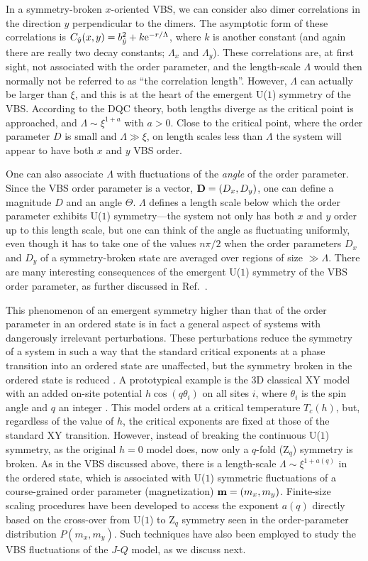 \documentclass[10pt,pre,aps,twocolumn,showpacs,subscriptaddresses,floatfix]{revtex4}
\begin{document}
In a symmetry-broken $x$-oriented VBS, we can consider also dimer correlations in the direction $y$ perpendicular to the dimers. The asymptotic form of these 
correlations is $C_{\hat y}(x,y) = b_{\hat y}^2 + k{\rm e}^{-r/\Lambda}$, where $k$ is another constant (and again there are really two decay constants; $\Lambda_x$ and
$\Lambda_y$). These correlations are, at first sight, not associated with the order parameter, and the length-scale $\Lambda$ would then normally not be referred 
to as ``the correlation length''. However, $\Lambda$ can actually be larger than $\xi$, and this is at the heart of the emergent U($1$) symmetry of the VBS. 
According to the DQC theory, both lengths diverge as the critical point is approached, and $\Lambda \sim \xi^{1+a}$ with $a>0$. Close to the critical point, 
where the order parameter $D$ is small and $\Lambda \gg \xi$, on length scales less than $\Lambda$ the system will appear to have both $x$ and $y$ VBS order.

One can also associate $\Lambda$ with fluctuations of the {\it angle} of the order parameter. Since the VBS order parameter is a vector, ${\bf D}= (D_x,D_y)$, 
one can define a magnitude $D$ and an angle $\Theta$. $\Lambda$ defines a length scale below which the order parameter exhibits U($1$) symmetry---the system
not only has both $x$ and $y$ order up to this length scale, but one can think of the angle as fluctuating uniformly, even though it has to take one of the 
values $n\pi/2$ when the order parameters $D_x$ and $D_y$ of a symmetry-broken state are averaged over regions of size $\gg \Lambda$. There are many interesting 
consequences of the emergent U($1$) symmetry of the VBS order parameter, as further discussed in Ref.~\cite{Sandvik12}.

This phenomenon of an emergent symmetry higher than that of the order parameter in an ordered state is in fact a general aspect of systems with 
dangerously irrelevant perturbations. These perturbations reduce the symmetry of a system in such a way that the standard critical exponents 
at a phase transition into an ordered state are unaffected, but the symmetry broken in the ordered state is reduced \cite{Jose77,Oshikawa00}. A 
prototypical example is the 3D classical XY model with an added on-site potential $h\cos(q\theta_i)$ on all sites $i$, where $\theta_i$ is the spin 
angle and $q$ an integer \cite{Carmona00}. This model orders at a critical temperature $T_c(h)$, but, regardless of the value of $h$, the critical exponents 
are fixed at those of the standard XY transition. However, instead of breaking the continuous U($1$) symmetry, as the original $h=0$ model does, 
now only a $q$-fold (Z$_q$) symmetry is broken. As in the VBS discussed above, there is a length-scale $\Lambda \sim \xi^{1+a(q)}$ in the ordered state, which 
is associated with U($1$) symmetric fluctuations of a course-grained order parameter (magnetization) ${\bf m}=(m_x,m_y)$. Finite-size scaling procedures have been 
developed \cite{Lou07} to access the exponent $a(q)$ directly based on the cross-over from U($1$) to Z$_q$ symmetry seen in the order-parameter distribution 
$P(m_x,m_y)$. Such techniques have also been employed to study the VBS fluctuations of the $J$-$Q$ model, as we discuss next.
\end{document}
